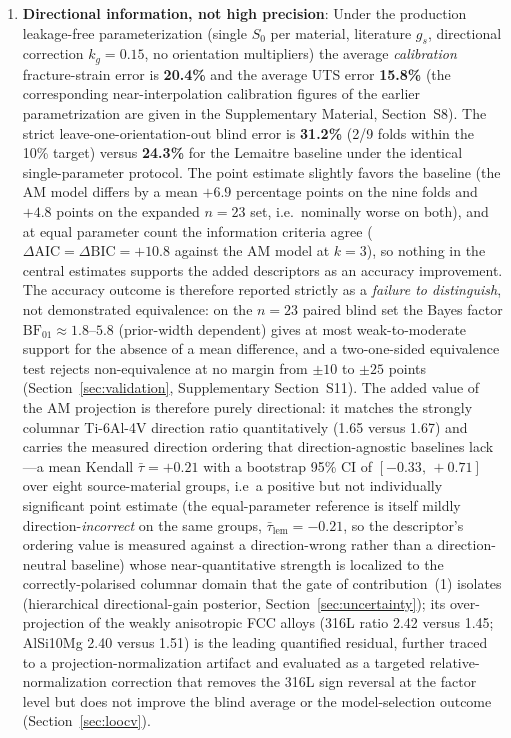 \begin{enumerate}
    \item \textbf{Directional information, not high precision}: Under the production leakage-free parameterization (single $S_0$ per material, literature $g_s$, directional correction $k_g = 0.15$, no orientation multipliers) the average \emph{calibration} fracture-strain error is \textbf{20.4\%} and the average UTS error \textbf{15.8\%} (the corresponding near-interpolation calibration figures of the earlier parametrization are given in the Supplementary Material, Section~S8). The strict leave-one-orientation-out blind error is \textbf{31.2\%} (2/9 folds within the 10\% target) versus \textbf{24.3\%} for the Lemaitre baseline under the identical single-parameter protocol. The point estimate slightly favors the baseline (the AM model differs by a mean $+6.9$ percentage points on the nine folds and $+4.8$ points on the expanded $n=23$ set, i.e.\ nominally worse on both), and at equal parameter count the information criteria agree ($\Delta\mathrm{AIC} = \Delta\mathrm{BIC} = +10.8$ against the AM model at $k=3$), so nothing in the central estimates supports the added descriptors as an accuracy improvement. The accuracy outcome is therefore reported strictly as a \emph{failure to distinguish}, not demonstrated equivalence: on the $n=23$ paired blind set the Bayes factor $\mathrm{BF}_{01}\approx1.8$--$5.8$ (prior-width dependent) gives at most weak-to-moderate support for the absence of a mean difference, and a two-one-sided equivalence test rejects non-equivalence at no margin from $\pm10$ to $\pm25$ points (Section~\ref{sec:validation}, Supplementary Section~S11). The added value of the AM projection is therefore purely directional: it matches the strongly columnar Ti-6Al-4V direction ratio quantitatively (1.65 versus 1.67) and carries the measured direction ordering that direction-agnostic baselines lack---a mean Kendall $\bar\tau = +0.21$ with a bootstrap 95\% CI of $[-0.33,\,+0.71]$ over eight source-material groups, i.e\ a positive but not individually significant point estimate (the equal-parameter reference is itself mildly direction-\emph{incorrect} on the same groups, $\bar\tau_{\mathrm{lem}}=-0.21$, so the descriptor's ordering value is measured against a direction-wrong rather than a direction-neutral baseline) whose near-quantitative strength is localized to the correctly-polarised columnar domain that the gate of contribution~(1) isolates (hierarchical directional-gain posterior, Section~\ref{sec:uncertainty}); its over-projection of the weakly anisotropic FCC alloys (316L ratio 2.42 versus 1.45; AlSi10Mg 2.40 versus 1.51) is the leading quantified residual, further traced to a projection-normalization artifact and evaluated as a targeted relative-normalization correction that removes the 316L sign reversal at the factor level but does not improve the blind average or the model-selection outcome (Section~\ref{sec:loocv}).
    

\end{enumerate}

